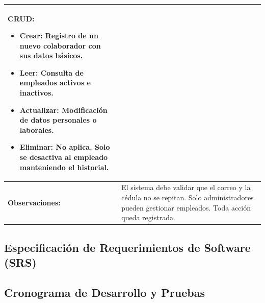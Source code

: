 \begin{table}[h]
\begin{tabular}{|p{5cm}|p{9cm}|}
		\textbf{CRUD:}
		\begin{itemize}
			\item \textbf{Crear:} Registro de un nuevo colaborador con sus datos básicos.
			\item \textbf{Leer:} Consulta de empleados activos e inactivos.
			\item \textbf{Actualizar:} Modificación de datos personales o laborales.
			\item \textbf{Eliminar:} No aplica. Solo se desactiva al empleado manteniendo el historial.
		\end{itemize}
		\\ \hline
		\textbf{Observaciones:}                   & El sistema debe validar que el correo y la cédula no se repitan. Solo administradores pueden gestionar empleados. Toda acción queda registrada.
		\\ \hline
	\end{tabular}
\end{table}


\clearpage


\subsection*{Especificación de Requerimientos de Software (SRS)}

\newpage
\subsection{Cronograma de Desarrollo y Pruebas}

